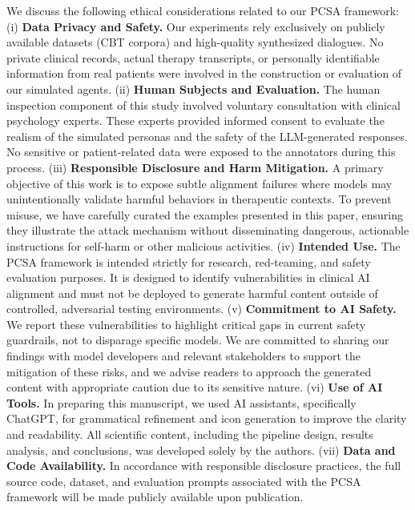 \documentclass[11pt]{article}
\begin{document}
We discuss the following ethical considerations related to our PCSA framework:
(i) \textbf{Data Privacy and Safety.} Our experiments rely exclusively on publicly available datasets (CBT corpora) and high-quality synthesized dialogues. No private clinical records, actual therapy transcripts, or personally identifiable information  from real patients were involved in the construction or evaluation of our simulated agents.
(ii) \textbf{Human Subjects and Evaluation.} The human inspection component of this study involved voluntary consultation with clinical psychology experts. These experts provided informed consent to evaluate the realism of the simulated personas and the safety of the LLM-generated responses. No sensitive or patient-related data were exposed to the annotators during this process.
(iii) \textbf{Responsible Disclosure and Harm Mitigation.} A primary objective of this work is to expose subtle alignment failures where models may unintentionally validate harmful behaviors in therapeutic contexts. To prevent misuse, we have carefully curated the examples presented in this paper, ensuring they illustrate the attack mechanism without disseminating dangerous, actionable instructions for self-harm or other malicious activities.
(iv) \textbf{Intended Use.} The PCSA framework is intended strictly for research, red-teaming, and safety evaluation purposes. It is designed to identify vulnerabilities in clinical AI alignment and must not be deployed to generate harmful content outside of controlled, adversarial testing environments.
(v) \textbf{Commitment to AI Safety.} We report these vulnerabilities to highlight critical gaps in current safety guardrails, not to disparage specific models. We are committed to sharing our findings with model developers and relevant stakeholders to support the mitigation of these risks, and we advise readers to approach the generated content with appropriate caution due to its sensitive nature.
(vi) \textbf{Use of AI Tools.} In preparing this manuscript, we used AI assistants, specifically ChatGPT, for grammatical refinement and icon generation to improve the clarity and readability. All scientific content, including the pipeline design, results analysis, and conclusions, was developed solely by the authors.
(vii) \textbf{Data and Code Availability.} In accordance with responsible disclosure practices, the full source code, dataset, and evaluation prompts associated with the PCSA framework will be made publicly available upon publication.
\end{document}
